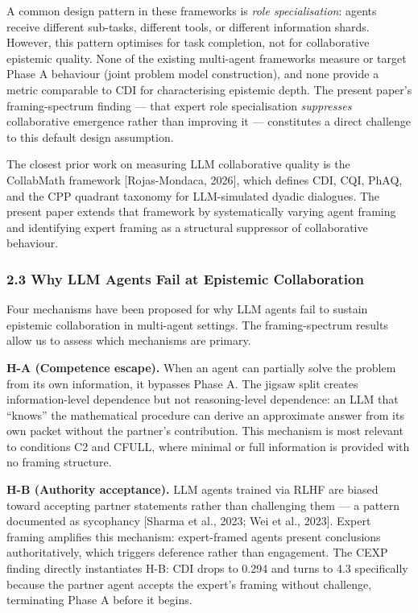 \documentclass[
  11pt,
]{article}
\newcounter{none} %
\begin{document}
A common design pattern in these frameworks is \emph{role specialisation}: agents receive different sub-tasks, different tools, or different information shards. However, this pattern optimises for task completion, not for collaborative epistemic quality. None of the existing multi-agent frameworks measure or target Phase A behaviour (joint problem model construction), and none provide a metric comparable to CDI for characterising epistemic depth. The present paper's framing-spectrum finding --- that expert role specialisation \emph{suppresses} collaborative emergence rather than improving it --- constitutes a direct challenge to this default design assumption.

The closest prior work on measuring LLM collaborative quality is the CollabMath framework [Rojas-Mondaca, 2026], which defines CDI, CQI, PhAQ, and the CPP quadrant taxonomy for LLM-simulated dyadic dialogues. The present paper extends that framework by systematically varying agent framing and identifying expert framing as a structural suppressor of collaborative behaviour.

\subsubsection{2.3 Why LLM Agents Fail at Epistemic
Collaboration}\label{why-llm-agents-fail-at-epistemic-collaboration}

Four mechanisms have been proposed for why LLM agents fail to sustain epistemic collaboration in multi-agent settings. The framing-spectrum results allow us to assess which mechanisms are primary.

\textbf{H-A (Competence escape).} When an agent can partially solve the problem from its own information, it bypasses Phase A. The jigsaw split creates information-level dependence but not reasoning-level dependence: an LLM that ``knows'' the mathematical procedure can derive an approximate answer from its own packet without the partner's contribution. This mechanism is most relevant to conditions C2 and CFULL, where minimal or full information is provided with no framing structure.

\textbf{H-B (Authority acceptance).} LLM agents trained via RLHF are biased toward accepting partner statements rather than challenging them --- a pattern documented as sycophancy [Sharma et al., 2023; Wei et al., 2023]. Expert framing amplifies this mechanism: expert-framed agents present conclusions authoritatively, which triggers deference rather than engagement. The CEXP finding directly instantiates H-B: CDI drops to 0.294 and turns to 4.3 specifically because the partner agent accepts the expert's framing without challenge, terminating Phase A before it begins.
\end{document}
